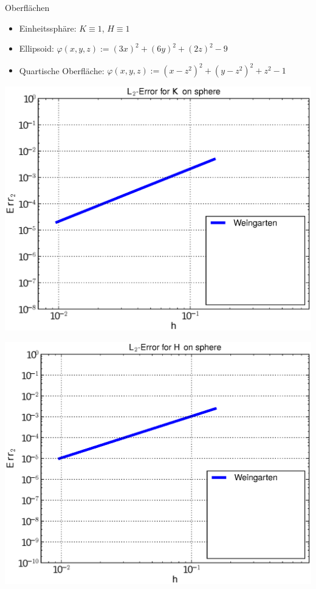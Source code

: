 \documentclass[handout]{beamer}
\begin{document}
  \begin{frame}
    \begin{block}{Oberflächen}
      \begin{itemize}
        \item<1-> Einheitssphäre: \( K\equiv 1 \), \( H\equiv 1 \)
        \item<8-> Ellipsoid: \(  \varphi(x,y,z) := (3x)^{2} + (6y)^{2} + (2z)^{2} - 9  \)
        \item<16-> Quartische Oberfläche: \( \varphi(x,y,z) :=  (x-z^{2})^{2} + (y-z^{2})^{2} + z^{2} - 1  \)
      \end{itemize}
    \end{block}
    \vfill
    \begin{overprint}
          \begin{minipage}[t]{0.49\textwidth}
            \centering\includegraphics[width=\textwidth]{bilder/Curvature/sphere/ErrKL2_1.eps}
          \end{minipage}\hfill
          \begin{minipage}[t]{0.49\textwidth}
            \centering\includegraphics[width=\textwidth]{bilder/Curvature/sphere/ErrHL2_1.eps}

\end{minipage}
\end{overprint}
\end{frame}
\end{document}
